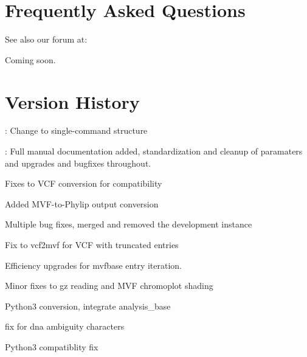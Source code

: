 \documentclass[letterpaper,11pt,english]{sphinxmanual}
\begin{document}
\chapter{Frequently Asked Questions}
\label{\detokenize{faq:frequently-asked-questions}}\label{\detokenize{faq::doc}}
See also our forum at: 

Coming soon.


\chapter{Version History}
\label{\detokenize{version:version-history}}\label{\detokenize{version::doc}}

: Change to single-command structure


: Full manual documentation added, standardization and cleanup of paramaters and upgrades and bugfixes throughout.


Fixes to VCF conversion for compatibility


Added MVF-to-Phylip output conversion 


Multiple bug fixes, merged and removed the development instance


Fix to vcf2mvf for VCF with truncated entries


Efficiency upgrades for mvfbase entry iteration.


Minor fixes to gz reading and MVF chromoplot shading


Python3 conversion, integrate analysis\_base


fix for dna ambiguity characters


Python3 compatiblity fix
\end{document}
